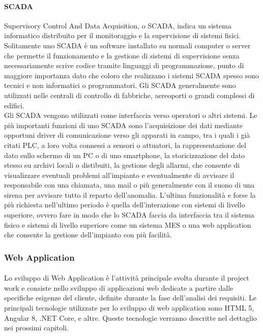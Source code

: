   \paragraph{SCADA}
  Supervisory Control And Data Acquisition, o SCADA, indica un sistema informatico distribuito 
  per il monitoraggio e la supervisione di sistemi fisici. Solitamente uno SCADA è un software installato su normali computer 
  o server che permette il funzionamento e la gestione di sistemi di supervisione senza necessariamente scrive codice 
  tramite linguaggi di programmazione, punto di maggiore importanza dato che coloro che realizzano i sistemi SCADA spesso 
  sono tecnici e non informatici o programmatori. Gli SCADA generalmente sono utilizzati nelle centrali di controllo di fabbriche, 
  aereoporti o grandi complessi di edifici.\\
  Gli SCADA vengono utilizzati come interfaccia verso operatori o altri sistemi. Le più importanti funzioni di uno SCADA 
  sono l'acquisizione dei dati mediante opportuni driver di comunicazione verso gli apparati in campo, tra i quali 
  i già citati PLC, a loro volta connessi a sensori o attuatori, la rappresentazione del dato sullo schermo di un PC o di 
  uno smartphone, la storicizzazione del dato stesso su archivi locali o distibuiti, la gestione degli allarmi, che consente 
  di visualizzare eventuali problemi all'impianto e eventualmente di avvisare il responsabile con una chiamata, una mail o più 
  generalmente con il suono di una sirena per avvisare tutto il reparto dell'anomalia. L'ultima funzionalità e forse la più 
  richiesta nell'ultimo periodo è quella dell'interazione con sistemi di livello superiore, ovvero fare in modo che lo 
  SCADA faccia da interfaccia tra il sistema fisico e sistemi di livello superiore come un sistema MES o una web application 
  che consente la gestione dell'impianto con più facilità.
  \subsubsection{Web Application}
  \paragraph{}
  Lo sviluppo di Web Application è l'attività principale svolta durante il project work e consiste nello 
  sviluppo di applicazioni web dedicate a partire dalle specifiche esigenze del cliente, definite durante la 
  fase dell'analisi dei requisiti. Le principali tecnologie utilizzate per lo sviluppo di web application sono 
  HTML 5, Angular 8, .NET Core, e altre. Queste tecnologie verranno descritte nel dettaglio nei prossimi capitoli.
